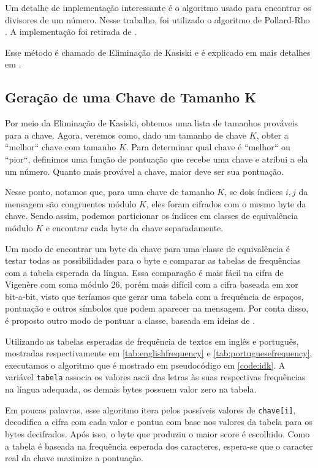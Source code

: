 \documentclass[conference]{IEEEtran}
\begin{document}
Um detalhe de implementação interessante é o algoritmo usado para encontrar os
divisores de um número. Nesse trabalho, foi utilizado o algoritmo de Pollard-Rho
\cite{pollard-rho}. A implementação foi retirada de \cite{pollard-rho-tiago}.

Esse método é chamado de Eliminação de Kasiski e é explicado em mais detalhes em
\cite{kasiski}.

\subsection{Geração de uma Chave de Tamanho K}
\label{sec:pontuacao}
Por meio da Eliminação de Kasiski, obtemos uma lista de tamanhos prováveis para
a chave. Agora, veremos como, dado um tamanho de chave $K$, obter a ``melhor``
chave com tamanho $K$. Para determinar qual chave é ``melhor`` ou ``pior``,
definimos uma função de pontuação que recebe uma chave e atribui a ela um
número. Quanto mais provável a chave, maior deve ser sua pontuação. 

Nesse ponto, notamos que, para uma chave de tamanho $K$, se dois índices $i, j$ da
mensagem são congruentes módulo $K$, eles foram cifrados com o mesmo byte da
chave. Sendo assim, podemos particionar os índices em classes de equivalência
módulo $K$ e encontrar cada byte da chave separadamente.

Um modo de encontrar um byte da chave para uma classe de equivalência é testar
todas as possibilidades para o byte e comparar as tabelas de frequências com a tabela
esperada da língua. Essa comparação é mais fácil na cifra de Vigenère com soma
módulo 26, porém mais difícil com a cifra baseada em xor bit-a-bit, visto que
teríamos que gerar uma tabela com a frequência de espaços, pontuação e outros
símbolos que podem aparecer na mensagem. Por conta disso, é proposto outro modo
de pontuar a classe, baseada em ideias de \cite{breaking-the-cipher}.

Utilizando as tabelas esperadas de frequência de textos em inglês e português,
mostradas respectivamente em \ref{tab:englishfrequency} e
\ref{tab:portuguesefrequency}, executamos o algoritmo que é mostrado em
pseudocódigo em \ref{code:idk}. A variável \verb|tabela| associa os valores
ascii das letras às suas respectivas frequências na língua adequada, os demais
bytes possuem valor zero na tabela.

Em poucas palavras, esse algoritmo itera pelos possíveis valores de
\verb|chave[i]|, decodifica a cifra com cada valor e pontua com base nos valores
da tabela para os bytes decifrados. Após isso, o byte que produziu o maior score
é escolhido. Como a tabela é baseada na frequência esperada dos caracteres,
espera-se que o caracter real da chave maximize a pontuação.
\end{document}
